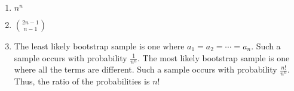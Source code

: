 \begin{enumerate}[label=(\alph*)]
\item $n^{n}$

\item $\binom{2n-1}{n-1}$

\item The least likely bootstrap sample is one where $a_{1} = a_{2} = \cdots = a_{n}$. 
Such a sample occurs with probability $\frac{1}{n^{n}}$. The most likely 
bootstrap sample is one where all the terms are different. Such a sample 
occurs with probability $\frac{n!}{n^{n}}$. Thus, the ratio of the probabilities 
is $n!$
\end{enumerate}